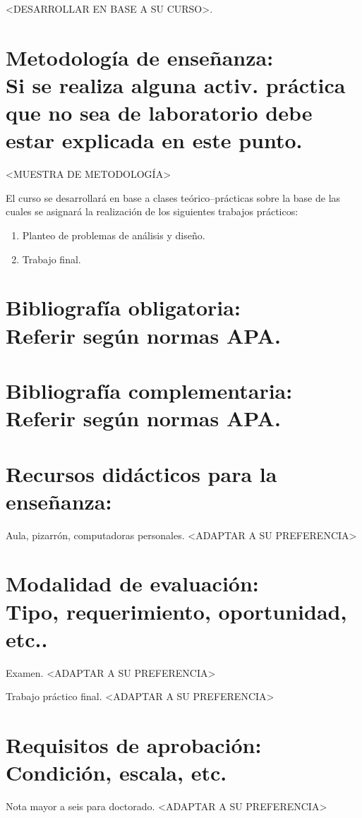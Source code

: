 \documentclass[a4paper,12pt]{article}
\begin{document}
<DESARROLLAR EN BASE A SU CURSO>.
    
\section{ Metodología de enseñanza: \\ {{\normalfont \tiny Si se realiza alguna activ. práctica que no sea de laboratorio debe estar explicada en este punto.}}}

<MUESTRA DE METODOLOGÍA>

El curso se desarrollará en base a clases teórico–prácticas sobre la base de las cuales se asignará la realización de los siguientes trabajos prácticos:
\begin{enumerate}
\item Planteo de problemas de análisis y diseño.
\item Trabajo final.
\end{enumerate}

\section{ Bibliografía obligatoria: \\ {{\normalfont \tiny Referir según normas APA.}}}

\printbibliography[category={obligatoria},heading=none]

\section{ Bibliografía complementaria: \\ {{\normalfont \tiny Referir según normas APA.}}}

\printbibliography[category={complementaria},heading=none]

\section{ Recursos didácticos para la enseñanza:}

Aula, pizarrón, computadoras personales. <ADAPTAR A SU PREFERENCIA>

\section{ Modalidad de evaluación: \\ {{\normalfont \tiny Tipo, requerimiento, oportunidad, etc..}}}

Examen. <ADAPTAR A SU PREFERENCIA>

Trabajo práctico final. <ADAPTAR A SU PREFERENCIA>

\section{ Requisitos de aprobación: \\ {{\normalfont \tiny Condición, escala, etc.}}}

Nota mayor a seis para doctorado. <ADAPTAR A SU PREFERENCIA>
\end{document}
